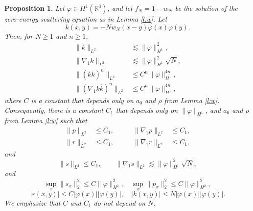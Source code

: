 \documentclass[11pt,a4paper]{scrartcl}
\newtheorem{prp}[thm]{Proposition}
\newcommand{\R}{\mathds{R}}
\newcommand{\norm}[1]{\lVert#1\rVert}	%
\newcommand{\bd}{\begin{displaymath}}			%
\newcommand{\ed}{\end{displaymath}}
\begin{document}
\begin{prp}
  \label{p:psr}
  Let $\varphi \in H^1(\R^3)$, and let $f_N=1-w_N$ be the solution of the
  zero-energy scattering equation as in Lemma \ref{l:w}. Let
  \[
    k(x,y) = - N w_N(x-y) \varphi(x) \varphi(y).
  \]
  Then, for $N \ge 1$ and $n \ge 1$,
  \begin{align}
    \| k \|_{L^2} & \apprle \| \varphi \|_{H^1}^2, \label{k} \tag{i} \\
    \| \nabla_1 k \|_{L^2} & \apprle \| \varphi \|_{H^1}^2 \sqrt{N},
    \label{gradk} \tag{ii} \\
    \| (k \overline{k})^n \|_{L^2} & \le C^n \| \varphi \|_{H^1}^{4n},
    \tag{iii} \\
    \| (\nabla_1 k \overline{k})^n \|_{L^2} & \le C^n \| \varphi
    \|_{H^1}^{4n}, \tag{iv}
  \end{align}
  where $C$ is a constant that depends only on $a_0$ and $\rho$ from Lemma
  \ref{l:w}. Consequently, there is a constant $C_1$ that depends only on $\| \varphi \|_{H^1}$, and
  $a_0$ and $\rho$ from Lemma \ref{l:w} such that
  \begin{equation}
    \begin{alignedat}{2}
      \| p \|_{L^2} & \le C_1, \qquad & \| \nabla_1 p \|_{L^2} & \le C_1, \\
      \| r \|_{L^2} & \le C_1, \qquad & \| \nabla_1 r \|_{L^2} & \le C_1,
    \end{alignedat}
    \tag{v}
  \end{equation}
  and
  \begin{equation}
    \| s \|_{L^2} \le C_1, \qquad \| \nabla_1 s \|_{L^2} \apprle \| \varphi
    \|_{H^1}^2 \sqrt{N}, \tag{vi}
  \end{equation}
 and
\bd
\sup_{x} \norm{s_x}_2^2 \leq C \norm{\varphi}_{H^2}^2, \quad \sup_{x} \norm{p_x}_2^2 \leq C \norm{\varphi}_{H^2}^2,
\ed
\bd
\lvert r(x,y)\rvert \leq C \lvert\varphi(x)\rvert \lvert\varphi(y)\rvert, \quad \lvert k(x,y)\rvert \leq N \lvert \varphi(x)\rvert \lvert \varphi(y)\rvert.
\ed
We emphasize that $C$ and $C_1$ do not depend on $N$.
\end{prp}
\end{document}
